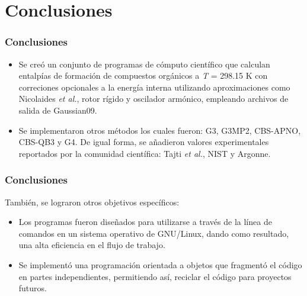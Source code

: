 \documentclass{beamer}
\begin{document}
\section{Conclusiones}
\begin{frame}
\frametitle{Conclusiones}

\begin{itemize}

\item Se creó un conjunto de programas de cómputo científico que calculan entalpías de formación de compuestos orgánicos a \textit{T} = 298.15 K con correciones opcionales a la energía interna utilizando aproximaciones como Nicolaides \textit{et al.}, rotor rígido y oscilador armónico, empleando archivos de salida de Gaussian09.

\vspace{1cm}

\item Se implementaron otros métodos los cuales fueron: G3, G3MP2, CBS-APNO, CBS-QB3 y G4. De igual forma, se añadieron valores experimentales reportados por la comunidad científica: Tajti \textit{et al.}, NIST y Argonne.

\end{itemize}
\end{frame}

\begin{frame}
\frametitle{Conclusiones}
También, se lograron otros objetivos específicos:
\vspace{1cm}

\begin{itemize}
\item Los programas fueron diseñados para utilizarse a través de la línea de comandos en un sistema operativo de GNU/Linux, dando como resultado, una alta eficiencia en el flujo de trabajo.

\item Se implementó una programación orientada a objetos que fragmentó el código en partes independientes, permitiendo así, reciclar el código para proyectos futuros.
\end{itemize}
\end{frame}
\end{document}
